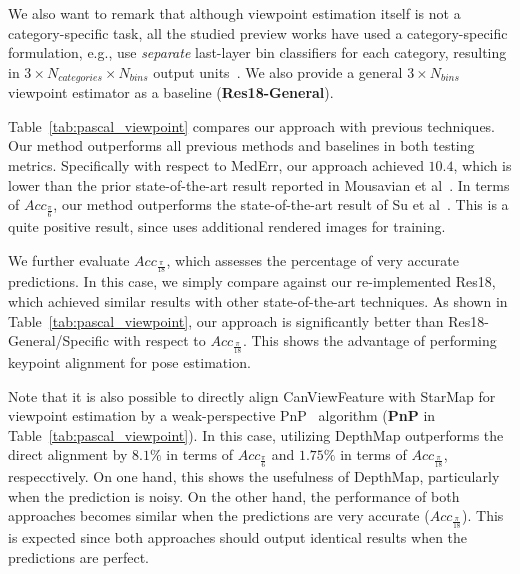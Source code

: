 \documentclass[runningheads]{llncs}
\begin{document}
We also want to remark that although viewpoint estimation itself is not a category-specific task, all the studied preview works have used a category-specific formulation, e.g., use \emph{separate} last-layer bin classifiers for each category, resulting in $3 \times N_{categories} \times N_{bins}$ output units~\cite{tulsiani2015pose}. 
We also provide a general $3 \times N_{bins}$ viewpoint estimator as a baseline (\textbf{Res18-General}).

Table~\ref{tab:pascal_viewpoint} compares our approach with previous techniques. Our method outperforms all previous methods and baselines in both testing metrics. Specifically with respect to MedErr, our approach achieved $10.4$, which is lower than the prior state-of-the-art result reported in Mousavian et al~\cite{mousavian20173d}. 
In terms of $Acc_{\frac{\pi}{6}}$, our method outperforms the state-of-the-art result of Su et al~\cite{su2015render}. 
This is a quite positive result, since \cite{su2015render} uses additional rendered images for training.

We further evaluate $\mathit{Acc}_\frac{\pi}{18}$, which assesses the percentage of very accurate predictions. In this case, we simply compare against our re-implemented Res18, which achieved similar results with other state-of-the-art techniques. 
As shown in Table~\ref{tab:pascal_viewpoint}, our approach is significantly better than Res18-General/Specific with respect to $\mathit{Acc}_\frac{\pi}{18}$. This shows the advantage of performing keypoint alignment for pose estimation. 

Note that it is also possible to directly align CanViewFeature with StarMap for viewpoint estimation by a weak-perspective PnP~\cite{pavlakos20176} algorithm (\textbf{PnP} in Table~\ref{tab:pascal_viewpoint}).
In this case, utilizing DepthMap outperforms the direct alignment by $8.1\%$ in terms of $\mathit{Acc}_\frac{\pi}{6}$ and $1.75\%$ in terms of $\mathit{Acc}_\frac{\pi}{18}$, respecctively. 
On one hand, this shows the usefulness of DepthMap, particularly when the prediction is noisy. On the other hand, the performance of both approaches becomes similar when the predictions are very accurate ($\mathit{Acc}_\frac{\pi}{18}$). This is expected since both approaches should output identical results when the predictions are perfect.
\end{document}
